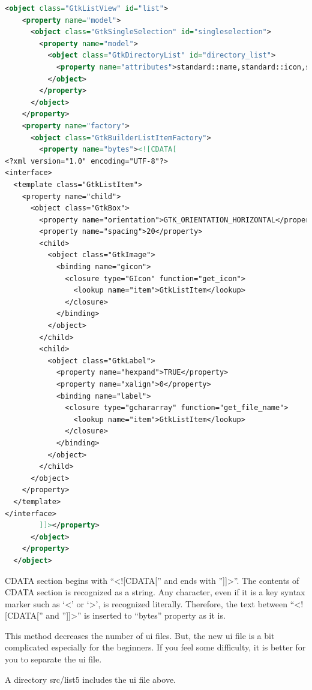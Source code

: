 \begin{lstlisting}[language=XML]
  <object class="GtkListView" id="list">
    <property name="model">
      <object class="GtkSingleSelection" id="singleselection">
        <property name="model">
          <object class="GtkDirectoryList" id="directory_list">
            <property name="attributes">standard::name,standard::icon,standard::content-type</property>
          </object>
        </property>
      </object>
    </property>
    <property name="factory">
      <object class="GtkBuilderListItemFactory">
        <property name="bytes"><![CDATA[
<?xml version="1.0" encoding="UTF-8"?>
<interface>
  <template class="GtkListItem">
    <property name="child">
      <object class="GtkBox">
        <property name="orientation">GTK_ORIENTATION_HORIZONTAL</property>
        <property name="spacing">20</property>
        <child>
          <object class="GtkImage">
            <binding name="gicon">
              <closure type="GIcon" function="get_icon">
                <lookup name="item">GtkListItem</lookup>
              </closure>
            </binding>
          </object>
        </child>
        <child>
          <object class="GtkLabel">
            <property name="hexpand">TRUE</property>
            <property name="xalign">0</property>
            <binding name="label">
              <closure type="gchararray" function="get_file_name">
                <lookup name="item">GtkListItem</lookup>
              </closure>
            </binding>
          </object>
        </child>
      </object>
    </property>
  </template>
</interface>
        ]]></property>
      </object>
    </property>
  </object>
\end{lstlisting}

CDATA section begins with ``\textless!{[}CDATA{[}'' and ends with
''{]}{]}\textgreater{}''. The contents of CDATA section is recognized as
a string. Any character, even if it is a key syntax marker such as
`\textless{}' or `\textgreater{}', is recognized literally. Therefore,
the text between ``\textless!{[}CDATA{[}'' and ''{]}{]}\textgreater{}''
is inserted to ``bytes'' property as it is.

This method decreases the number of ui files. But, the new ui file is a
bit complicated especially for the beginners. If you feel some
difficulty, it is better for you to separate the ui file.

A directory src/list5 includes the ui file above.
